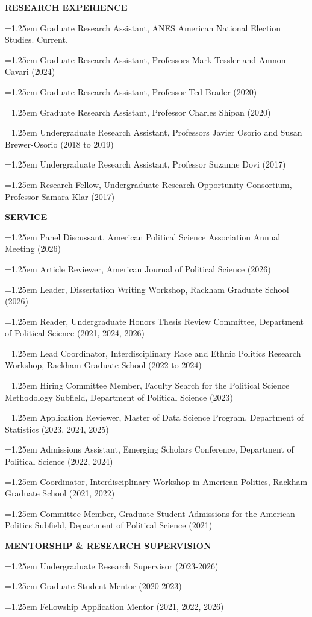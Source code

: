 \documentclass[11pt]{article}
\newlength{\leftcol}
\newlength{\rightcol}
\newcommand{\cvsection}[2]{%
\vspace{1.2em}
\noindent
\begin{minipage}[t]{\leftcol}
\raggedright \bfseries #1
\end{minipage}
\hspace{0.35in}
\begin{minipage}[t]{\rightcol}
#2
\end{minipage}
\par
}
\newcommand{\entry}[1]{%
\hangindent=1.25em
\hangafter=1
#1\par\vspace{0.35em}
}
\begin{document}
\cvsection{RESEARCH EXPERIENCE}{
\entry{Graduate Research Assistant, ANES American National Election Studies. Current.}

\entry{Graduate Research Assistant, Professors Mark Tessler and Amnon Cavari (2024)}

\entry{Graduate Research Assistant, Professor Ted Brader (2020)}

\entry{Graduate Research Assistant, Professor Charles Shipan (2020)}

\entry{Undergraduate Research Assistant, Professors Javier Osorio and Susan Brewer-Osorio (2018 to 2019)}

\entry{Undergraduate Research Assistant, Professor Suzanne Dovi (2017)}

\entry{Research Fellow, Undergraduate Research Opportunity Consortium, Professor Samara Klar (2017)}
}
\vspace{0.45em}

\cvsection{SERVICE}{

\entry{Panel Discussant, American Political Science Association Annual Meeting (2026)}

\entry{Article Reviewer, American Journal of Political Science (2026)}

\entry{Leader, Dissertation Writing Workshop, Rackham Graduate School (2026)}

\entry{Reader, Undergraduate Honors Thesis Review Committee, Department of Political Science (2021, 2024, 2026)}

\entry{Lead Coordinator, Interdisciplinary Race and Ethnic Politics Research Workshop, Rackham Graduate School (2022 to 2024)}

\entry{Hiring Committee Member, Faculty Search for the Political Science Methodology Subfield, Department of Political Science (2023)}

\entry{Application Reviewer, Master of Data Science Program, Department of Statistics (2023, 2024, 2025)}

\entry{Admissions Assistant, Emerging Scholars Conference, Department of Political Science (2022, 2024)}

\entry{Coordinator, Interdisciplinary Workshop in American Politics, Rackham Graduate School (2021, 2022)}

\entry{Committee Member, Graduate Student Admissions for the American Politics Subfield, Department of Political Science (2021)}
}

\vspace{0.45em}


\cvsection{MENTORSHIP \& RESEARCH SUPERVISION}{
\entry{Undergraduate Research Supervisor (2023-2026)}
\entry{Graduate Student Mentor (2020-2023)}
\entry{Fellowship Application Mentor (2021, 2022, 2026)}
}
\vspace{0.45em}
\end{document}
